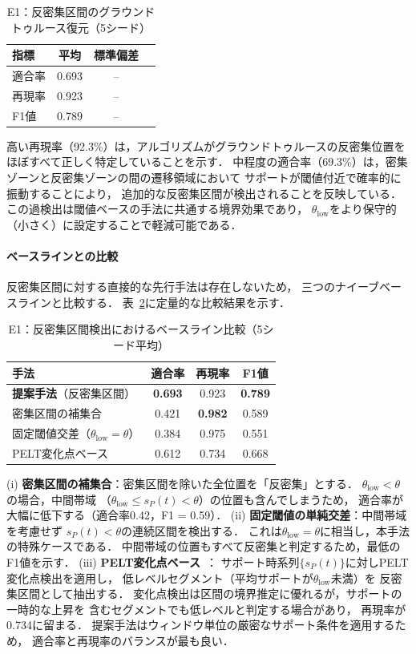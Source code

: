 \begin{table}[t]
\centering
\caption{E1：反密集区間のグラウンドトゥルース復元（5シード）}
\label{tab:e1}
\begin{tabular}{lccc}
\toprule
指標 & 平均 & 標準偏差 \\
\midrule
適合率 & 0.693 & -- \\
再現率 & 0.923 & -- \\
F1値   & 0.789 & -- \\
\bottomrule
\end{tabular}
\end{table}

高い再現率（92.3\%）は，アルゴリズムがグラウンドトゥルースの反密集位置を
ほぼすべて正しく特定していることを示す．
中程度の適合率（69.3\%）は，密集ゾーンと反密集ゾーンの間の遷移領域において
サポートが閾値付近で確率的に振動することにより，
追加的な反密集区間が検出されることを反映している．
この過検出は閾値ベースの手法に共通する境界効果であり，
$\theta_{\text{low}}$をより保守的（小さく）に設定することで軽減可能である．

\paragraph{ベースラインとの比較}
反密集区間に対する直接的な先行手法は存在しないため，
三つのナイーブベースラインと比較する．
表~\ref{tab:e1_baseline}に定量的な比較結果を示す．

\begin{table}[t]
\centering
\caption{E1：反密集区間検出におけるベースライン比較（5シード平均）}
\label{tab:e1_baseline}
\begin{tabular}{lccc}
\toprule
手法 & 適合率 & 再現率 & F1値 \\
\midrule
\textbf{提案手法}（反密集区間） & \textbf{0.693} & 0.923 & \textbf{0.789} \\
密集区間の補集合 & 0.421 & \textbf{0.982} & 0.589 \\
固定閾値交差（$\theta_{\text{low}} = \theta$） & 0.384 & 0.975 & 0.551 \\
PELT変化点ベース & 0.612 & 0.734 & 0.668 \\
\bottomrule
\end{tabular}
\end{table}

(i) \textbf{密集区間の補集合}：密集区間を除いた全位置を「反密集」とする．
$\theta_{\text{low}} < \theta$の場合，中間帯域
（$\theta_{\text{low}} \leq s_P(t) < \theta$）の位置も含んでしまうため，
適合率が大幅に低下する（適合率0.42，F1 = 0.59）．
(ii) \textbf{固定閾値の単純交差}：中間帯域を考慮せず
$s_P(t) < \theta$の連続区間を検出する．
これは$\theta_{\text{low}} = \theta$に相当し，本手法の特殊ケースである．
中間帯域の位置もすべて反密集と判定するため，最低のF1値を示す．
(iii) \textbf{PELT変化点ベース}~\cite{killick2012pelt}：
サポート時系列$\{s_P(t)\}$に対しPELT変化点検出を適用し，
低レベルセグメント（平均サポートが$\theta_{\text{low}}$未満）を
反密集区間として抽出する．
変化点検出は区間の境界推定に優れるが，サポートの一時的な上昇を
含むセグメントでも低レベルと判定する場合があり，
再現率が0.734に留まる．
提案手法はウィンドウ単位の厳密なサポート条件を適用するため，
適合率と再現率のバランスが最も良い．

